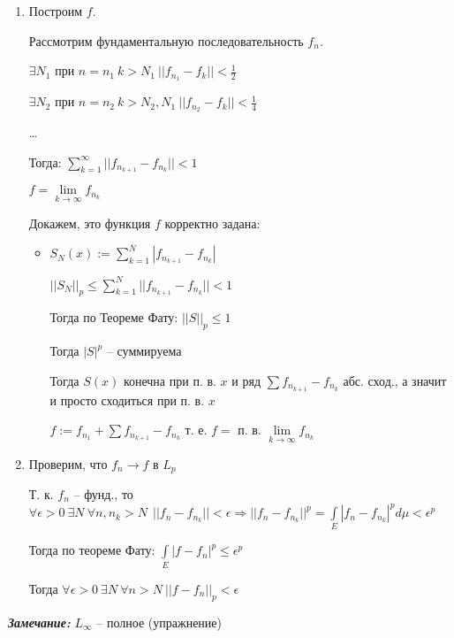 \documentclass[paper=a4, fontsize=13.2pt]{article}
\begin{document}
\begin{enumerate}
	\item Построим $ f $.
	
	Рассмотрим фундаментальную последовательность $ f_n $.
	
	$ \exists N_1 $ при $ n = n_1 ~ k > N_1 ~ ||f_{n_1} - f_k|| < \frac{1}{2}$
	
	$ \exists N_2 $ при $ n = n_2 ~ k > N_2, N_1 ~ ||f_{n_2} - f_k|| < \frac{1}{4}$
	
	\dots
	
	Тогда: $ \sum_{k = 1}^{\infty} || f_{n_{k+1}} - f_{n_k} || < 1$
	
	$ f = \lim\limits_{k \rightarrow \infty} f_{n_k}$
	 
	Докажем, это функция $ f $ корректно задана: 
	\begin{itemize}
		\item 
		$ S_N (x) := \sum_{k = 1}^{N}|f_{n_{k+1}} - f_{n_k}|$
		
		$ ||S_N||_p \leq \sum_{k = 1}^{N} || f_{n_{k+1}} - f_{n_k} || < 1$
		
		Тогда по Теореме Фату: $ ||S||_p \leq 1 $
		
		Тогда $ |S|^p $ -- суммируема 
		
		Тогда $ S(x) $ конечна при п. в. $ x $  и ряд $ \sum f_{n_{k + 1}} - f_{n_k} $ абс. сход., а значит  и просто сходиться при п. в. $ x $
		
		$ f:= f_{n_1} +  \sum f_{n_{k + 1}} - f_{n_k} $ т. е. $ f = $ п. в. $ \lim\limits_{k \rightarrow \infty} f_{n_k} $
	\end{itemize}
	
	\item Проверим, что $ f_n \rightarrow f $ в $ L_p $ 
	
	Т. к. $ f_n $ -- фунд., то $ \forall \epsilon > 0 ~ \exists N ~ \forall n, n_k > N ~ ~ ||f_n - f_{n_k} || < \epsilon \Rightarrow 
	|| f_n  - f_{n_k} ||^p  = \int\limits_{E} |f_n  - f_{n_k}|^p d\mu < \epsilon^p $ 

	Тогда по теореме Фату: $ \int\limits_{E} |f - f_n|^p \leq \epsilon^p$
	
	Тогда $ \forall \epsilon > 0 ~ \exists N ~ \forall n > N ~ || f - f_n ||_p < \epsilon $
	
	
\end{enumerate}

\textbf{\emph{Замечание:}} $ L_{\infty} $ -- полное (упражнение)
\end{document}
